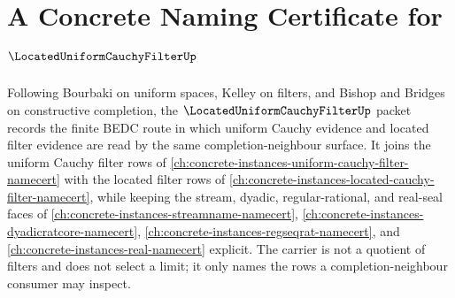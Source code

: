 \chapter{A Concrete Naming Certificate for $\LocatedUniformCauchyFilterUp$}
\label{ch:concrete-instances-located-uniform-cauchy-filter-namecert}

Following Bourbaki on uniform spaces, Kelley on filters, and Bishop and Bridges on constructive completion, the $\LocatedUniformCauchyFilterUp$ packet records the finite BEDC route in which uniform Cauchy evidence and located filter evidence are read by the same completion-neighbour surface. It joins the uniform Cauchy filter rows of \autoref{ch:concrete-instances-uniform-cauchy-filter-namecert} with the located filter rows of \autoref{ch:concrete-instances-located-cauchy-filter-namecert}, while keeping the stream, dyadic, regular-rational, and real-seal faces of \autoref{ch:concrete-instances-streamname-namecert}, \autoref{ch:concrete-instances-dyadicratcore-namecert}, \autoref{ch:concrete-instances-regseqrat-namecert}, and \autoref{ch:concrete-instances-real-namecert} explicit. The carrier is not a quotient of filters and does not select a limit; it only names the rows a completion-neighbour consumer may inspect.

